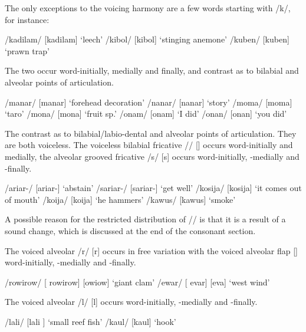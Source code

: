 The only exceptions to the voicing harmony are a few words starting with /k/, for instance:


\ea
\ea
/kadilam/  [ka{{\textprimstress}dilam}]  `leech'
\ex
/kibol/  [ki{{\textprimstress}bol}]  `stinging anemone'
\ex
/kuben/  [ku{{\textprimstress}ben}]  `prawn trap'
\z
\z

The two  occur word-initially, medially and finally, and contrast as to bilabial and alveolar points of articulation. 

\ea
\ea
/manar/  [ma{{\textprimstress}nar}]  `forehead decoration'
\ex
/nanar/  [na{{\textprimstress}nar}]  `story'
\ex
/moma/  [mo{{\textprimstress}ma}]  `taro'
\ex
/mona/  [mo{{\textprimstress}na}]  `fruit sp.'
\ex
/onam/  [o{{\textprimstress}nam}]  `I did'
\ex
/onan/  [o{{\textprimstress}nan}]  `you did'
\z
\z

The  contrast as to bilabial/labio-dental and alveolar points of articulation. They are both voiceless. The voiceless bilabial fricative /{\textphi}/ [{\textphi}] occurs word-initially and medially, the alveolar grooved fricative /s/ [s] occurs word-initially, -medially and \nobreakdash-finally. 

\ea
\ea
/{\textphi}ariar-/  [{\textphi}a{{\textprimstress}riar}-]  `abstain'
\ex
/sariar-/  [sa{{\textprimstress}riar}-]  `get well'
\ex
/kosija/  [ko{{\textprimstress}sija}]  `it comes out of mouth'
\ex
/ko{\textphi}ija/  [ko{{\textprimstress}}{\textphi}ija]  `he hammers'
\ex
/kawus/  [ka{{\textprimstress}wus}]  `smoke'
\z
\z

A possible reason for the restricted distribution of /{\textphi}/ is that it is a result of a sound change, which is discussed at the end of the consonant section.

The voiced alveolar  /r/ [r] occurs in free variation with the voiced alveolar flap [{\textfishhookr}] word-initially, -medially and -finally.  

\ea
\ea 
/rowirow/  [ ro{{\textprimstress}wirow}] {\Tilde} [{\textfishhookr}o{{\textprimstress}wi}{\textfishhookr}ow]  `giant clam'
\ex
/ewar/  [ e{{\textprimstress}var}] {\Tilde} [e{{\textprimstress}va}{\textfishhookr}]  `west wind'
\z
\z

The voiced alveolar  /l/ [l] occurs word-initially, -medially and -finally. 

\ea
\ea
/lali/  [la{{\textprimstress}li} ]  `small reef fish'
\ex
/kaul/  [{{\textprimstress}kaul}]  `hook'
\z
\z

